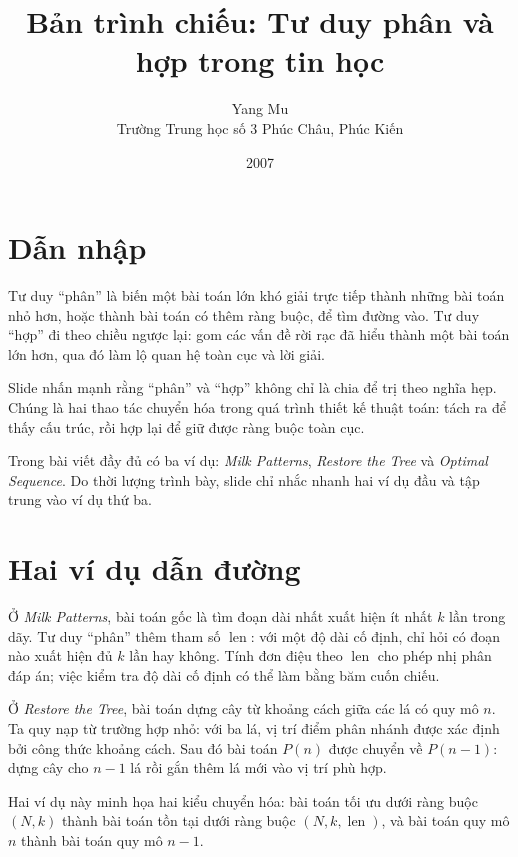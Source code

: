 \documentclass[11pt]{article}
\title{Bản trình chiếu: Tư duy phân và hợp trong tin học}
\author{Yang Mu\\Trường Trung học số 3 Phúc Châu, Phúc Kiến}
\date{2007}
\newcommand{\len}{\operatorname{len}}
\begin{document}
\maketitle


\section{Dẫn nhập}

Tư duy ``phân'' là biến một bài toán lớn khó giải trực tiếp thành những bài
toán nhỏ hơn, hoặc thành bài toán có thêm ràng buộc, để tìm đường vào. Tư duy
``hợp'' đi theo chiều ngược lại: gom các vấn đề rời rạc đã hiểu thành một bài
toán lớn hơn, qua đó làm lộ quan hệ toàn cục và lời giải.

Slide nhấn mạnh rằng ``phân'' và ``hợp'' không chỉ là chia để trị theo nghĩa
hẹp. Chúng là hai thao tác chuyển hóa trong quá trình thiết kế thuật toán:
tách ra để thấy cấu trúc, rồi hợp lại để giữ được ràng buộc toàn cục.

Trong bài viết đầy đủ có ba ví dụ: \textit{Milk Patterns},
\textit{Restore the Tree} và \textit{Optimal Sequence}. Do thời lượng trình
bày, slide chỉ nhắc nhanh hai ví dụ đầu và tập trung vào ví dụ thứ ba.

\section{Hai ví dụ dẫn đường}

Ở \textit{Milk Patterns}, bài toán gốc là tìm đoạn dài nhất xuất hiện ít nhất
\(k\) lần trong dãy. Tư duy ``phân'' thêm tham số \(\len\): với một độ dài
cố định, chỉ hỏi có đoạn nào xuất hiện đủ \(k\) lần hay không. Tính đơn điệu
theo \(\len\) cho phép nhị phân đáp án; việc kiểm tra độ dài cố định có thể
làm bằng băm cuốn chiếu.

Ở \textit{Restore the Tree}, bài toán dựng cây từ khoảng cách giữa các lá có
quy mô \(n\). Ta quy nạp từ trường hợp nhỏ: với ba lá, vị trí điểm phân nhánh
được xác định bởi công thức khoảng cách. Sau đó bài toán \(P(n)\) được chuyển
về \(P(n-1)\): dựng cây cho \(n-1\) lá rồi gắn thêm lá mới vào vị trí phù hợp.

Hai ví dụ này minh họa hai kiểu chuyển hóa: bài toán tối ưu dưới ràng buộc
\((N,k)\) thành bài toán tồn tại dưới ràng buộc \((N,k,\len)\), và bài toán
quy mô \(n\) thành bài toán quy mô \(n-1\).
\end{document}

